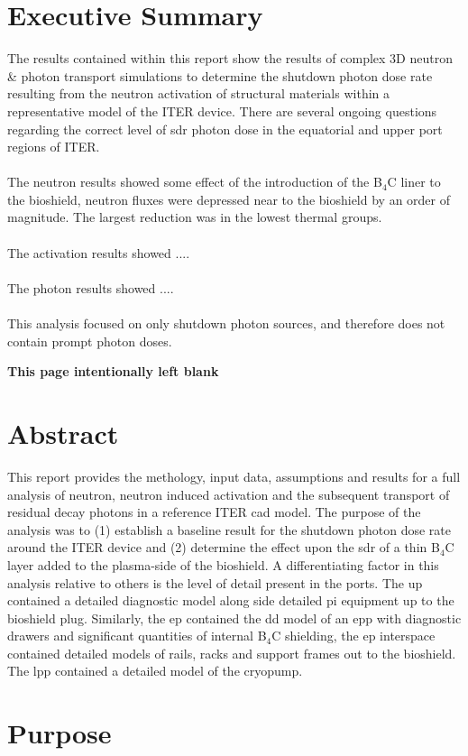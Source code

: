 \documentclass[12pt]{article}
\newcommand*{\blankpage}{%
\vspace*{\fill}
\begin{center}
 \centering \textbf{This page intentionally left blank}
\end{center}
\vspace{\fill}}
\begin{document}
\section*{Executive Summary}
The results contained within this report show the results of complex 3D neutron
\& photon transport simulations to determine the shutdown photon dose rate
resulting from the neutron activation of structural materials within a
representative model of the ITER device. There are several ongoing questions
regarding the correct level of \gls{sdr} photon dose in the equatorial and upper port
regions of ITER.
\\
\\
The neutron results showed some effect of the introduction of the B$_4$C liner to the
bioshield, neutron fluxes were depressed near to the bioshield by an order of magnitude.
The largest reduction was in the lowest thermal groups.
\\
\\
The activation results showed ....
\\
\\
The photon results showed ....
\\
\\
This analysis focused on only shutdown photon sources, and therefore does not
contain prompt photon doses.
\newpage
\blankpage
\newpage
\section*{Abstract}
This report provides the methology, input data, assumptions and results for a
full analysis of neutron, neutron induced activation and the subsequent
transport of residual decay photons in a reference ITER \gls{cad} model. The purpose
of the analysis was to (1) establish a baseline result for the shutdown photon
dose rate around the ITER device and (2) determine the effect upon the \gls{sdr} of a
thin B$_4$C layer added to the plasma-side of the bioshield. A differentiating
factor in this analysis relative to others is the level of detail present in
the ports. The \gls{up} contained a detailed diagnostic model along side detailed \gls{pi}
equipment up to the bioshield plug. Similarly, the \gls{ep} contained the \gls{dd} model of
an \gls{epp} with diagnostic drawers and significant quantities of internal B$_4$C
shielding, the \gls{ep} interspace contained detailed models of rails, racks and
support frames out to the bioshield. The \gls{lpp} contained a detailed model of the
cryopump. 
\newpage
\section{Purpose}
\end{document}
